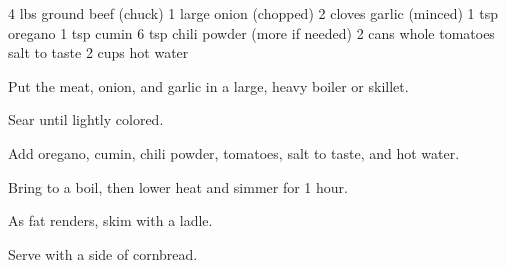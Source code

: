 \dishtype{}
\begin{ingreds}
    4 lbs ground beef (chuck)
    1 large onion (chopped)
    2 cloves garlic (minced)
    1 tsp oregano
    1 tsp cumin
    6 tsp chili powder (more if needed)
    2 cans whole tomatoes
    salt to taste
    2 cups hot water
\end{ingreds}
\begin{method}
    Put the meat, onion, and garlic in a large, heavy boiler or skillet.\par
    Sear until lightly colored.\par
    Add oregano, cumin, chili powder, tomatoes, salt to taste, and hot water.\par
    Bring to a boil, then lower heat and simmer for 1 hour.\par
    As fat renders, skim with a ladle.\par
    Serve with a side of cornbread.
\end{method}